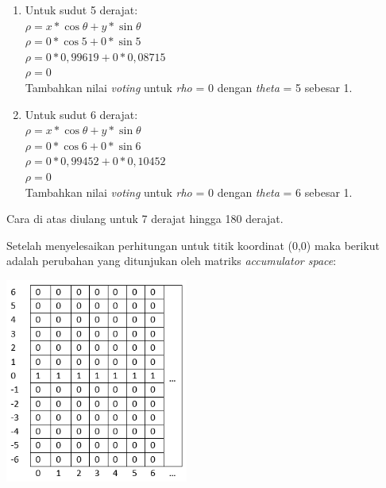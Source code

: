 \begin{enumerate}
$\rho = 0$\\
Tambahkan nilai \textit{voting} untuk \textit{rho} = 0 dengan \textit{theta} = 4 sebesar 1.
\item Untuk sudut 5 derajat:\\
$\rho = x * \cos{\theta} + y * \sin{\theta}$\\
$\rho = 0 * \cos{5} + 0 * \sin{5}$\\
$\rho = 0 * 0,99619 + 0 * 0,08715$\\
$\rho = 0$\\
Tambahkan nilai \textit{voting} untuk \textit{rho} = 0 dengan \textit{theta} = 5 sebesar 1.
\item Untuk sudut 6 derajat:\\
$\rho = x * \cos{\theta} + y * \sin{\theta}$\\
$\rho = 0 * \cos{6} + 0 * \sin{6}$\\
$\rho = 0 * 0,99452 + 0 * 0,10452$\\
$\rho = 0$\\
Tambahkan nilai \textit{voting} untuk \textit{rho} = 0 dengan \textit{theta} = 6 sebesar 1.
\end{enumerate}

\noindent Cara di atas diulang untuk 7 derajat hingga 180 derajat.

\noindent Setelah menyelesaikan perhitungan untuk titik koordinat (0,0) maka berikut adalah perubahan yang ditunjukan oleh matriks \textit{accumulator space}:

\begin{adjustbox}{width=1\textwidth}
	\noindent\begin{minipage}{\linewidth}
		\centering\includegraphics[width=6cm]{images/AccumulatorSpace1.PNG}
		\label{tab:AccumulatorSpaceAfterVoting}
	\end{minipage}
\end{adjustbox}\\

